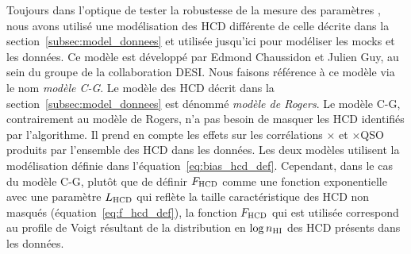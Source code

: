 \documentclass[11pt, twoside, a4paper, openright]{report}
\begin{document}
Toujours dans l'optique de tester la robustesse de la mesure des paramètres \lya{}, nous avons utilisé une modélisation des HCD différente de celle décrite dans la section~\ref{subsec:model_donnees} et utilisée jusqu'ici pour modéliser les mocks et les données.
Ce modèle est développé par Edmond Chaussidon et Julien Guy, au sein du groupe \lya{} de la collaboration DESI.
Nous faisons référence à ce modèle via le nom \emph{modèle C-G}. Le modèle des HCD décrit dans la section~\ref{subsec:model_donnees} est dénommé \emph{modèle de Rogers}.
Le modèle C-G, contrairement au modèle de Rogers, n'a pas besoin de masquer les HCD identifiés par l'algorithme. Il prend en compte les effets sur les corrélations \lya{}$\times$\lya{} et \lya{}$\times$QSO produits par l'ensemble des HCD dans les données.
Les deux modèles utilisent la modélisation définie dans l'équation~\ref{eq:bias_hcd_def}. Cependant, dans le cas du modèle C-G, plutôt que de définir $F_{\textsc{HCD}}$ comme une fonction exponentielle avec une paramètre $L_{\textsc{HCD}}$ qui reflète la taille caractéristique des HCD non masqués (équation~\ref{eq:f_hcd_def}), la fonction $F_{\textsc{HCD}}$ qui est utilisée correspond au profile de Voigt résultant de la distribution en $\log n_{\textsc{HI}}$ des HCD présents dans les données.
\end{document}
